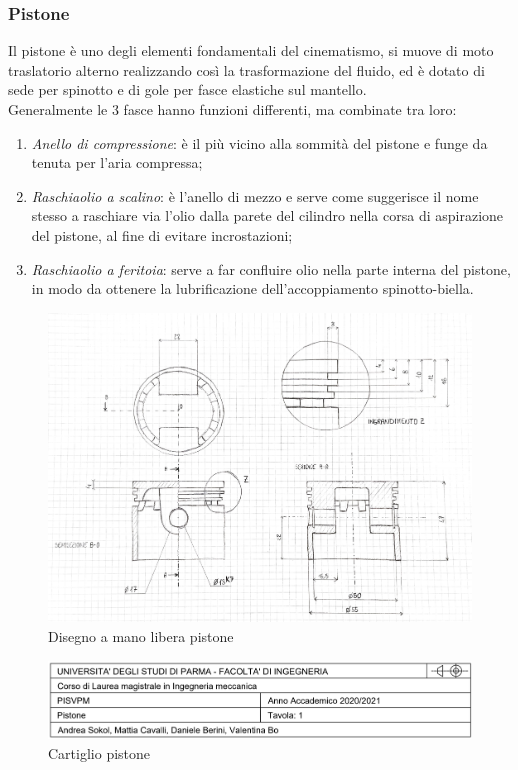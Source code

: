 \subsubsection{Pistone}
Il pistone è uno degli elementi fondamentali del cinematismo, si muove di moto traslatorio alterno realizzando così la trasformazione del fluido, ed è dotato di sede per spinotto e di gole per fasce elastiche sul mantello.\\
Generalmente le 3 fasce hanno funzioni differenti, ma combinate tra loro:
\begin{enumerate}
    \item \emph{Anello di compressione}: è il più vicino alla sommità del pistone e funge da tenuta per l’aria compressa;
    \item \emph{Raschiaolio a scalino}: è l’anello di mezzo e serve come suggerisce il nome stesso a raschiare via l’olio dalla parete del cilindro nella corsa di aspirazione del pistone, al fine di evitare incrostazioni;
    \item \emph{Raschiaolio a feritoia}: serve a far confluire olio nella parte interna del pistone, in modo da ottenere la lubrificazione dell'accoppiamento spinotto-biella. 
\end{enumerate}
\begin{figure}[h]
    \centering
    \includegraphics[scale=0.3]{Immagini/SchizzoPistone.png}
    \caption{Disegno a mano libera pistone}
    \label{fig:SchizzoPistone}
\end{figure}
\begin{figure}[h]
    \centering
    \includegraphics[scale=0.5]{Immagini/CartiglioPistone.png}
    \caption{Cartiglio pistone}
    \label{fig:CartiglioPistone}
\end{figure}
